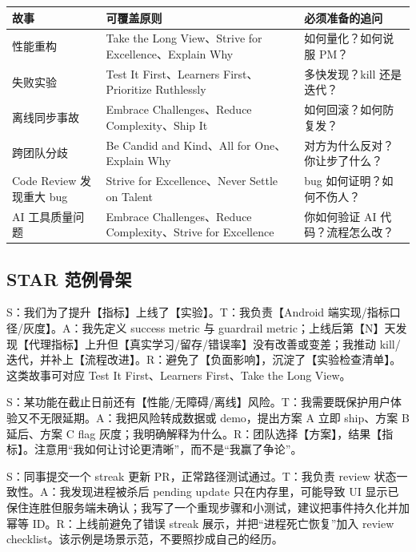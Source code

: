 \begin{center}
\begin{tabularx}{\linewidth}{@{}l X X@{}}
\toprule
\textbf{故事} & \textbf{可覆盖原则} & \textbf{必须准备的追问} \\
\midrule
性能重构 & Take the Long View、Strive for Excellence、Explain Why & 如何量化？如何说服 PM？ \\
失败实验 & Test It First、Learners First、Prioritize Ruthlessly & 多快发现？kill 还是迭代？ \\
离线同步事故 & Embrace Challenges、Reduce Complexity、Ship It & 如何回滚？如何防复发？ \\
跨团队分歧 & Be Candid and Kind、All for One、Explain Why & 对方为什么反对？你让步了什么？ \\
Code Review 发现重大 bug & Strive for Excellence、Never Settle on Talent & bug 如何证明？如何不伤人？ \\
AI 工具质量问题 & Embrace Challenges、Reduce Complexity、Strive for Excellence & 你如何验证 AI 代码？流程怎么改？ \\
\bottomrule
\end{tabularx}
\end{center}

\subsection{STAR 范例骨架}

\begin{followup}[模板：失败实验]
S：我们为了提升【指标】上线了【实验】。T：我负责【Android 端实现/指标口径/灰度】。A：我先定义 success metric 与 guardrail metric；上线后第【N】天发现【代理指标】上升但【真实学习/留存/错误率】没有改善或变差；我推动 kill/迭代，并补上【流程改进】。R：避免了【负面影响】，沉淀了【实验检查清单】。这类故事可对应 Test It First、Learners First、Take the Long View。
\end{followup}

\begin{followup}[模板：与 PM 或 Designer 分歧]
S：某功能在截止日前还有【性能/无障碍/离线】风险。T：我需要既保护用户体验又不无限延期。A：我把风险转成数据或 demo，提出方案 A 立即 ship、方案 B 延后、方案 C flag 灰度；我明确解释为什么。R：团队选择【方案】，结果【指标】。注意用“我如何让讨论更清晰”，而不是“我赢了争论”。
\end{followup}

\begin{followup}
S：同事提交一个 streak 更新 PR，正常路径测试通过。T：我负责 review 状态一致性。A：我发现进程被杀后 pending update 只在内存里，可能导致 UI 显示已保住连胜但服务端未确认；我写了一个重现步骤和小测试，建议把事件持久化并加幂等 ID。R：上线前避免了错误 streak 展示，并把“进程死亡恢复”加入 review checklist。该示例是场景示范，不要照抄成自己的经历。
\end{followup}

